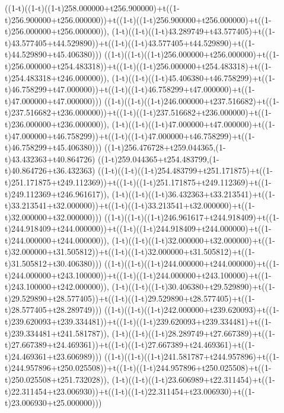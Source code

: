 ((1-t)((1-t)((1-t)258.000000+t256.900000)+t((1-t)256.900000+t256.000000))+t((1-t)((1-t)256.900000+t256.000000)+t((1-t)256.000000+t256.000000)),                                     (1-t)((1-t)((1-t)43.289749+t43.577405)+t((1-t)43.577405+t44.529890))+t((1-t)((1-t)43.577405+t44.529890)+t((1-t)44.529890+t45.406380)))
((1-t)((1-t)((1-t)256.000000+t256.000000)+t((1-t)256.000000+t254.483318))+t((1-t)((1-t)256.000000+t254.483318)+t((1-t)254.483318+t246.000000)),                                     (1-t)((1-t)((1-t)45.406380+t46.758299)+t((1-t)46.758299+t47.000000))+t((1-t)((1-t)46.758299+t47.000000)+t((1-t)47.000000+t47.000000)))
((1-t)((1-t)((1-t)246.000000+t237.516682)+t((1-t)237.516682+t236.000000))+t((1-t)((1-t)237.516682+t236.000000)+t((1-t)236.000000+t236.000000)),                                     (1-t)((1-t)((1-t)47.000000+t47.000000)+t((1-t)47.000000+t46.758299))+t((1-t)((1-t)47.000000+t46.758299)+t((1-t)46.758299+t45.406380)))
((1-t)256.476728+t259.044365,(1-t)43.432363+t40.864726)
((1-t)259.044365+t254.483799,(1-t)40.864726+t36.432363)
((1-t)((1-t)((1-t)254.483799+t251.171875)+t((1-t)251.171875+t249.112369))+t((1-t)((1-t)251.171875+t249.112369)+t((1-t)249.112369+t246.961617)),                                     (1-t)((1-t)((1-t)36.432363+t33.213541)+t((1-t)33.213541+t32.000000))+t((1-t)((1-t)33.213541+t32.000000)+t((1-t)32.000000+t32.000000)))
((1-t)((1-t)((1-t)246.961617+t244.918409)+t((1-t)244.918409+t244.000000))+t((1-t)((1-t)244.918409+t244.000000)+t((1-t)244.000000+t244.000000)),                                     (1-t)((1-t)((1-t)32.000000+t32.000000)+t((1-t)32.000000+t31.505812))+t((1-t)((1-t)32.000000+t31.505812)+t((1-t)31.505812+t30.406380)))
((1-t)((1-t)((1-t)244.000000+t244.000000)+t((1-t)244.000000+t243.100000))+t((1-t)((1-t)244.000000+t243.100000)+t((1-t)243.100000+t242.000000)),                                     (1-t)((1-t)((1-t)30.406380+t29.529890)+t((1-t)29.529890+t28.577405))+t((1-t)((1-t)29.529890+t28.577405)+t((1-t)28.577405+t28.289749)))
((1-t)((1-t)((1-t)242.000000+t239.620093)+t((1-t)239.620093+t239.334481))+t((1-t)((1-t)239.620093+t239.334481)+t((1-t)239.334481+t241.581787)),                                     (1-t)((1-t)((1-t)28.289749+t27.667389)+t((1-t)27.667389+t24.469361))+t((1-t)((1-t)27.667389+t24.469361)+t((1-t)24.469361+t23.606989)))
((1-t)((1-t)((1-t)241.581787+t244.957896)+t((1-t)244.957896+t250.025508))+t((1-t)((1-t)244.957896+t250.025508)+t((1-t)250.025508+t251.732028)),                                     (1-t)((1-t)((1-t)23.606989+t22.311454)+t((1-t)22.311454+t23.006930))+t((1-t)((1-t)22.311454+t23.006930)+t((1-t)23.006930+t25.000000)))

